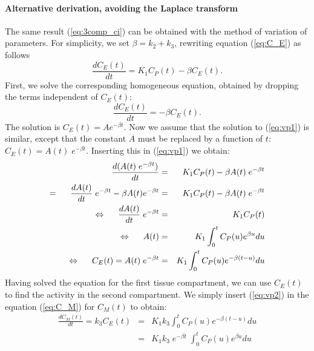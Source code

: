 \paragraph{Alternative derivation, avoiding the Laplace transform\\}
The same result (\ref{eq:3comp_ci}) can be obtained with the method of
variation of parameters.
For simplicity, we set $\beta = k_2 + k_3$,
rewriting equation (\ref{eq:C_E}) as follows
\begin{equation}
   \frac{dC_E(t)}{dt}  =  K_1 C_P(t) - \beta C_E(t). \label{eq:vp1}
\end{equation}
First, we solve the corresponding homogeneous equation, obtained by
dropping the terms independent of $C_E(t)$:
\begin{equation}
   \frac{dC_E(t)}{dt}  =  - \beta C_E(t).
\end{equation}
The solution is $C_E(t) = A e^{-\beta t}$. Now we assume that the
solution to (\ref{eq:vp1}) is similar, except that the constant $A$
must be replaced by a function of $t$: $C_E(t) = A(t) \; e^{-\beta
t}$. Inserting this in (\ref{eq:vp1}) we obtain:
\begin{align}
   \frac{d ( A(t) \; e^{-\beta t})}{dt} 
             &=&  K_1 C_P(t) - \beta A(t) \; e^{-\beta t}\\
 = \hspace{5mm} 
   \frac{d A(t)}{dt} \; e^{-\beta t} - \beta A(t) e^{-\beta t} 
              &=& K_1 C_P(t) - \beta A(t) \; e^{-\beta t}\\
\Leftrightarrow  \hspace{5mm} 
   \frac{d A(t)}{dt} \; e^{-\beta t} &=& K_1 C_P(t)\\
\Leftrightarrow  \hspace{5mm} 
   A(t) &=& K_1 \int_0^t C_P(u) e^{\beta u} du\\
\Leftrightarrow  \hspace{5mm} 
   C_E(t) = A(t)  \; e^{-\beta t}
      &=& K_1 \int_0^t C_P(u) e^{- \beta (t -u)} du \label{eq:vp2}
\end{align}
%
Having solved the equation for the first tissue compartment, we can
use $C_E(t)$ to find the activity in the second compartment.  We
simply insert (\ref{eq:vp2}) in the equation (\ref{eq:C_M}) for
$C_M(t)$ to obtain:
\begin{align}
  \frac{d C_M(t)}{dt} = k_3 C_E(t) 
    &=& K_1 k_3 \int_0^t C_P(u) e^{- \beta (t -u)} du \nonumber\\
    &=& K_1 k_3 \; e^{- \beta t} \; \int_0^t C_P(u) e^{\beta u} du
\end{align}
